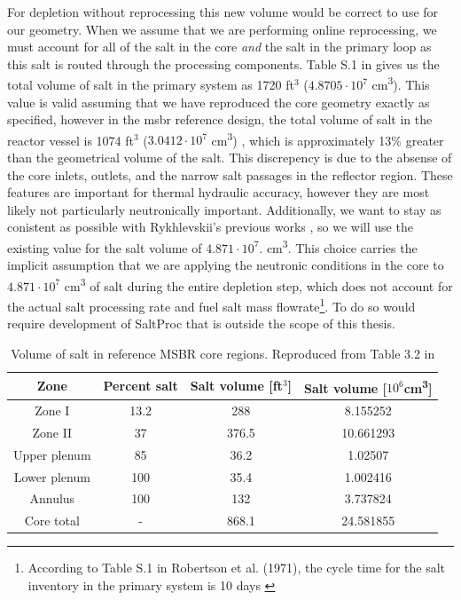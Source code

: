 For depletion without reprocessing this new volume would be correct to
use for our geometry. When we assume that we are performing online reprocessing,
we must account for all of the salt in the core {\it and} the salt in the
primary loop as this salt is routed through the processing components. Table S.1
in \cite{robertson_conceptual_1971} gives us the total volume of salt in the
primary system as  1720 ft$^{3}$ ($4.8705\cdot 10^7$ \unit{\centi\metre\cubed}).
This value is valid assuming that we have reproduced the core geometry exactly
as specified, however in the \Gls{msbr} reference design, the total volume of
salt in the reactor vessel is 1074 ft$^{3}$ ($3.0412 \cdot 10^{7}$
\unit{\centi\metre\cubed}) \cite{robertson_conceptual_1971}, which is 
approximately 13\% greater than the geometrical volume of the salt. This
discrepency is due to the absense of the core inlets, outlets, and the narrow
salt passages in the reflector region. These features are important for thermal
hydraulic accuracy, however they are most likely not particularly neutronically
important. Additionally, we want to stay as conistent as possible with
Rykhlevskii's previous works \cite{rykhlevskii_fuel_2020}
\cite{rykhlevskii_modeling_2019}, so we will use the existing value for the salt
volume of $4.871\cdot 10^7$. \unit{\centi\metre\cubed}. This choice carries the
implicit assumption that we are applying the neutronic conditions in the core to
$4.871\cdot 10^{7}$ \unit{\centi\metre\cubed} of salt during the entire
depletion step, which does not account for the actual salt processing rate and
fuel salt mass flowrate\footnote{According to Table S.1 in Robertson et al.
(1971), the cycle time for the salt inventory in the primary system is 10 days
\cite{robertson_conceptual_1971}}. To do so would require development of
SaltProc that is outside the scope of this thesis.

\begin{table}[htpb]
    \centering
    \caption[Volume of salt in reference MSBR core regions]{Volume of salt in
reference MSBR core regions. Reproduced from Table 3.2 in
\cite{robertson_conceptual_1971}}
    \label{tab:salt-volumes}
    \begin{tabular}{|c|c|cc|}
        \hline
        Zone & Percent salt & Salt volume [ft$^3$] & Salt volume [$10^6$\unit{\centi\metre\cubed}] \\
        \hline
        Zone I & 13.2 & 288 & 8.155252 \\
        \hline
        Zone II & 37 & 376.5 & 10.661293 \\
        \hline
        Upper plenum & 85 & 36.2 & 1.02507 \\ 
        \hline
        Lower plenum & 100 & 35.4 & 1.002416 \\ 
        \hline
        Annulus & 100 &  132 & 3.737824\\
        \hline
        Core total & - & 868.1 & 24.581855 \\ 
        \hline
    \end{tabular}
\end{table}

